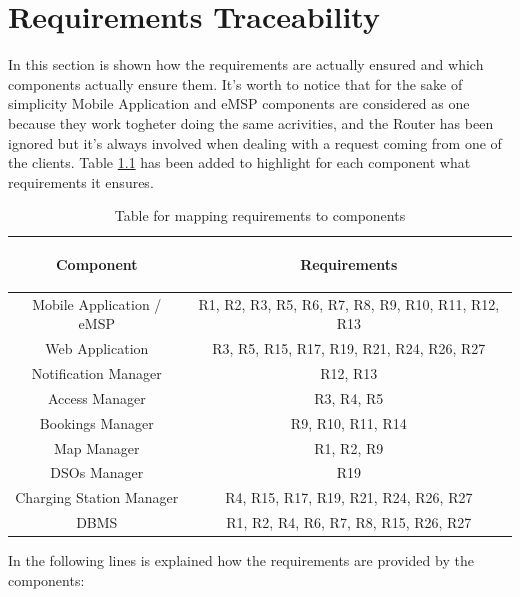 \documentclass[a4paper]{report}
\begin{document}
\chapter{Requirements Traceability}
In this section is shown how the requirements are actually ensured and which components actually ensure them. It's worth to notice that for the sake of simplicity Mobile Application and eMSP components are considered as one because they work togheter doing the same acrivities, and the Router has been ignored  but it's always involved when dealing with a request coming from one of the clients. 
Table \ref{tab:req-trace} has been added to highlight for each component what requirements it ensures.
\begin{table}[H]  
  \centering
  \begin{tabular}{|c|c|}
    \cline{1-2}
   	\rule{0pt}{10pt} 
   	\begin{large}
    \textbf{Component} 
    \end{large}&\begin{large}
    \textbf{Requirements} 
    \end{large}\\  \hline
    Mobile Application / eMSP &  R1, R2, R3, R5, R6, R7, R8, R9, R10, R11, R12, R13\\ \hline
    Web Application &  R3, R5, R15, R17, R19, R21, R24, R26, R27 \\ \hline
    Notification Manager &  R12, R13\\ \hline
    Access Manager & R3, R4, R5\\ \hline
    Bookings Manager & R9, R10, R11, R14\\ \hline
    Map Manager & R1, R2, R9 \\ \hline
    DSOs Manager &  R19\\ \hline
    Charging Station Manager & R4, R15, R17, R19, R21, R24, R26, R27 \\ \hline
    DBMS & R1, R2, R4, R6, R7, R8, R15, R26, R27 \\ \hline
    
  \end{tabular}
\caption{Table for mapping requirements to components} \label{tab:req-trace}
\end{table}
In the following lines is explained how the requirements are provided by the components:
\end{document}
